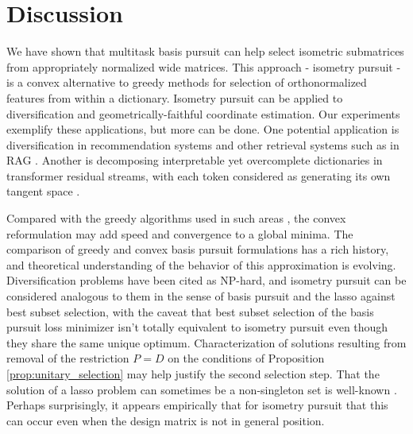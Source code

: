 \section{Discussion}
\label{sec:discussion}

We have shown that multitask basis pursuit can help select isometric submatrices from appropriately normalized wide matrices.
This approach - isometry pursuit - is a convex alternative to greedy methods for selection of orthonormalized features from within a dictionary.
Isometry pursuit can be applied to diversification and geometrically-faithful coordinate estimation.
Our experiments exemplify these applications, but more can be done.
One potential application is diversification in recommendation systems \citep{Carbonell2017-gi, Wu2019-uk, Langchain} and other retrieval systems such as in RAG \citep{Gao2023-cn, Pickett2024-ad, In2024-um, Weiss2024-xm, Vectara}.
Another is decomposing interpretable yet overcomplete dictionaries in transformer residual streams, with each token considered as generating its own tangent space \citep{templeton2024scaling, Makelov2024-bw}.

Compared with the greedy algorithms used in such areas \citep{Carbonell1998-ji, Barioni, Drosou, Qin2012-ok, KUNAVER2017154, Guo-shengbo, Abdool,Yu2016AGA,  Huang2024-wr, Pickett2024-ad}, the convex reformulation may add speed and convergence to a global minima.
The comparison of greedy \cite{Mallat93-wi, Mallat, Pati-93, Tropp05-ml} and convex \citep{Chen2001-hh, Tropp06-sg,Chen2006TheoreticalRO} basis pursuit formulations has a rich history, and theoretical understanding of the behavior of this approximation is evolving.
Diversification problems have been cited as NP-hard, and isometry pursuit can be considered analogous to them in the sense of basis pursuit and the lasso against best subset selection, with the caveat that best subset selection of the basis pursuit loss minimizer isn't totally equivalent to isometry pursuit even though they share the same unique optimum.
Characterization of solutions resulting from removal of the restriction $P = D$ on the conditions of Proposition \ref{prop:unitary_selection} may help justify the second selection step.
That the solution of a lasso problem can sometimes be a non-singleton set is well-known \citep{Osborne2000OnTL, DOSSAL2012117, Chrtien2011OnTG, Tibshirani2012TheLP, Ewald2017OnTD, Ali2018TheGL, Schneider2020-qt, Mishkin2022TheSP,Dupuis2019TheGO,Debarre2020OnTU,Everink2024TheGA}.
Perhaps surprisingly, it appears empirically that for isometry pursuit that this can occur even when the design matrix is not in general position.

